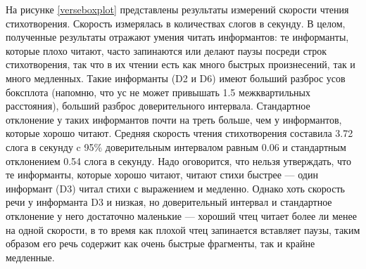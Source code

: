 \par На рисунке \ref{verseboxplot} представлены результаты измерений скорости чтения стихотворения. Скорость измерялась в количествах слогов в секунду. В целом, полученные результаты отражают умения читать информантов: те информанты, которые плохо читают, часто запинаются или делают паузы посреди строк стихотворения, так что в их чтении есть как много быстрых произнесений, так и много медленных. Такие информанты (D2 и D6) имеют больший разброс усов боксплота (напомню, что ус не может привышать 1.5 межквартильных расстояния), больший разброс доверительного интервала. Стандартное отклонение у таких информантов почти на треть больше, чем у информантов, которые хорошо читают. Средняя скорость чтения стихотворения составила 3.72 слога в секунду c 95\% доверительным интервалом равным 0.06 и стандартным отклонением 0.54 слога в секунду. Надо оговорится, что нельзя утверждать, что те информанты, которые хорошо читают, читают стихи быстрее --- один информант (D3) читал стихи с выражением и медленно. Однако хоть скорость речи у информанта D3 и низкая, но доверительный интервал и стандартное отклонение у него достаточно маленькие --- хороший чтец читает более ли менее на одной скорости, в то время как плохой чтец запинается вставляет паузы, таким образом его речь содержит как очень быстрые фрагменты, так и крайне медленные.
